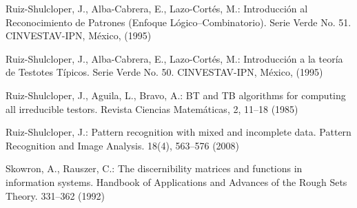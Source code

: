 \documentclass[citeauthoryear]{llncs}
\begin{document}
\begin{thebibliography}{}
	Ruiz-Shulcloper, J., Alba-Cabrera, E., Lazo-Cort\'es, M.:
	Introducci\'{o}n al Reconocimiento de Patrones (Enfoque L\'{o}gico--Combinatorio). 
	Serie Verde No. 51. CINVESTAV-IPN, México, (1995)

	Ruiz-Shulcloper, J., Alba-Cabrera, E., Lazo-Cort\'es, M.:
	Introducci\'{o}n a la teor\'ia de Testotes T\'ipicos. 
	Serie Verde No. 50. CINVESTAV-IPN, México, (1995)
	
	Ruiz-Shulcloper, J., Aguila, L., Bravo, A.:
	BT and TB algorithms for computing all irreducible testors. 
	Revista Ciencias Matem\'{a}ticas, 2, 11--18 (1985)

	Ruiz-Shulcloper, J.:
	Pattern recognition with mixed and incomplete data. 
	Pattern Recognition and Image Analysis. 18(4), 563--576 (2008)

	Skowron, A., Rauszer, C.:
	The discernibility matrices and functions in information systems. 
	Handbook of Applications and Advances of the Rough Sets Theory. 331--362  (1992)
	
	
\end{thebibliography}

%
\end{document}
